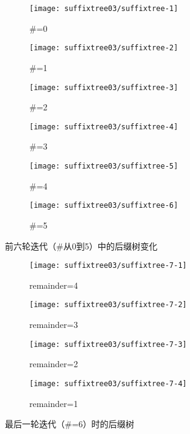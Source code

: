 
\begin{figure}
  \begin{subfigure}[t]{0.33\linewidth}
    \texttt{[image: suffixtree03/suffixtree-1]}
    \caption{\#=0}
    \label{suffixtree:fig:1}
  \end{subfigure}
  \begin{subfigure}[t]{0.33\linewidth}
    \texttt{[image: suffixtree03/suffixtree-2]}
        \caption{\#=1}
    \label{suffixtree:fig:2}
  \end{subfigure}
    \begin{subfigure}[t]{0.33\linewidth}
    \texttt{[image: suffixtree03/suffixtree-3]}
        \caption{\#=2}
    \label{suffixtree:fig:3}
  \end{subfigure}
  \begin{subfigure}[t]{0.33\linewidth}
    \texttt{[image: suffixtree03/suffixtree-4]}
    \caption{\#=3}
    \label{suffixtree:fig:4}
  \end{subfigure}
  \begin{subfigure}[t]{0.33\linewidth}
    \texttt{[image: suffixtree03/suffixtree-5]}
        \caption{\#=4}
    \label{suffixtree:fig:5}
  \end{subfigure}
    \begin{subfigure}[t]{0.33\linewidth}
    \texttt{[image: suffixtree03/suffixtree-6]}
        \caption{\#=5}
    \label{suffixtree:fig:6}
  \end{subfigure}
  \caption{前六轮迭代（\#从0到5）中的后缀树变化}
  \label{suffixtree:fig:0to5}
\end{figure}
\begin{figure}
  \begin{subfigure}[t]{0.5\linewidth}
    \texttt{[image: suffixtree03/suffixtree-7-1]}
    \caption{remainder=4}
    \label{suffixtree:fig:7-1}
  \end{subfigure}
  \begin{subfigure}[t]{0.5\linewidth}
    \texttt{[image: suffixtree03/suffixtree-7-2]}
        \caption{remainder=3}
    \label{suffixtree:fig:7-2}
  \end{subfigure}
  \begin{subfigure}[t]{0.5\textwidth}
    \texttt{[image: suffixtree03/suffixtree-7-3]}
    \caption{remainder=2}
    \label{suffixtree:fig:7-3}
  \end{subfigure}
  \begin{subfigure}[t]{0.5\textwidth}
    \texttt{[image: suffixtree03/suffixtree-7-4]}
    \caption{remainder=1}
    \label{suffixtree:fig:7-4}
\end{subfigure}
\caption{最后一轮迭代（\#=6）时的后缀树}
\label{suffixtree:fig:7}
\end{figure}

